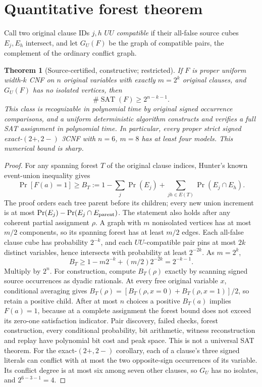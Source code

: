 \documentclass[10pt]{article}
\newtheorem{theorem}{Theorem}
\begin{document}
\section{Quantitative forest theorem}
Call two original clause IDs $j,h$ \emph{$UU$ compatible} if their all-false source cubes $E_j,E_h$ intersect, and let $G_U(F)$ be the graph of compatible pairs, the complement of the ordinary conflict graph.
\begin{theorem}[Source-certified, constructive; restricted]
If $F$ is proper uniform width-$k$ CNF on $n$ original variables with exactly $m=2^k$ original clauses, and $G_U(F)$ has no isolated vertices, then
\[
\boxed{\#\operatorname{SAT}(F)\ge 2^{n-k-1}.}
\]
This class is recognizable in polynomial time by original signed occurrence comparisons, and a uniform deterministic algorithm constructs and verifies a full SAT assignment in polynomial time. In particular, every proper strict signed exact-$(2+,2-)$ 3CNF with $n=6$, $m=8$ has at least four models. This numerical bound is sharp.
\end{theorem}
\begin{proof}
For any spanning forest $T$ of the original clause indices, Hunter's known event-union inequality gives
\[
\Pr[F(a)=1]\ge B_T :=
1-\sum_j\Pr(E_j)+\sum_{jh\in E(T)}\Pr(E_j\cap E_h).
\tag{1}
\]
The proof orders each tree parent before its children; every new union increment is at most $\Pr(E_j)-\Pr(E_j\cap E_{\rm parent})$. The statement also holds after any coherent partial assignment $\rho$. A graph with $m$ nonisolated vertices has at most $m/2$ components, so its spanning forest has at least $m/2$ edges. Each all-false clause cube has probability $2^{-k}$, and each $UU$-compatible pair pins at most $2k$ distinct variables, hence intersects with probability at least $2^{-2k}$. As $m=2^k$,
\[
 B_T\ge 1-m2^{-k}+(m/2)2^{-2k}=2^{-k-1}.
\]
Multiply by $2^n$. For construction, compute $B_T(\rho)$ exactly by scanning signed source occurrences as dyadic rationals. At every free original variable $x$, conditional averaging gives $B_T(\rho)=[B_T(\rho,x=0)+B_T(\rho,x=1)]/2$, so retain a positive child. After at most $n$ choices a positive $B_T(a)$ implies $F(a)=1$, because at a complete assignment the forest bound does not exceed its zero-one satisfaction indicator. Pair discovery, failed checks, forest construction, every conditional probability, bit arithmetic, witness reconstruction and replay have polynomial bit cost and peak space. This is not a universal SAT theorem.
For the exact-$(2+,2-)$ corollary, each of a clause's three signed literals can conflict with at most the two opposite-sign occurrences of its variable. Its conflict degree is at most six among seven other clauses, so $G_U$ has no isolates, and $2^{6-3-1}=4$.
\end{proof}
\end{document}
